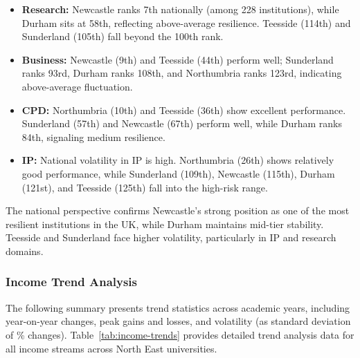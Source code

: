 \documentclass[journal,onecolumn, 10pt,draftclsnofoot]{IEEEtran}
\begin{document}
\begin{itemize}
    \item \textbf{Research:} Newcastle ranks 7th nationally (among 228 institutions), while Durham sits at 58th, reflecting above-average resilience. Teesside (114th) and Sunderland (105th) fall beyond the 100th rank.
    
    \item \textbf{Business:} Newcastle (9th) and Teesside (44th) perform well; Sunderland ranks 93rd, Durham ranks 108th, and Northumbria ranks 123rd, indicating above-average fluctuation.
    
    \item \textbf{CPD:} Northumbria (10th) and Teesside (36th) show excellent performance. Sunderland (57th) and Newcastle (67th) perform well, while Durham ranks 84th, signaling medium resilience.
    
    \item \textbf{IP:} National volatility in IP is high. Northumbria (26th) shows relatively good performance, while Sunderland (109th), Newcastle (115th), Durham (121st), and Teesside (125th) fall into the high-risk range.
\end{itemize}

The national perspective confirms Newcastle's strong position as one of the most resilient institutions in the UK, while Durham maintains mid-tier stability. Teesside and Sunderland face higher volatility, particularly in IP and research domains.

\subsubsection{Income Trend Analysis}

The following summary presents trend statistics across academic years, including year-on-year changes, peak gains and losses, and volatility (as standard deviation of \% changes). Table~\ref{tab:income-trends} provides detailed trend analysis data for all income streams across North East universities.
\end{document}
